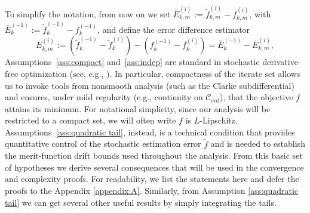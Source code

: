 \documentclass[11pt,a4paper]{article}
\newtheorem{remark}{Remark}[section]
\newcommand{\D}{\Delta}
\newcommand{\sara}[1]{{\color{red}{\textbf{[SS: #1]}}\color{black}}}
\begin{document}
\noindent
To simplify the notation, from now on we set $\bar E_{k,m}^{(i)}:=\tilde f^{(i)}_{k,m} - f^{(i)}_{k,m}$, with
\(
    \bar E_k^{(-1)}
    :=
    \tilde f_k^{(-1)}-f_k^{(-1)}
\),
 and define the error difference estimator \[E_{k,m}^{(i)}:=(\tilde f_k^{(-1)}-\tilde f_k^{(i)})-(f_k^{(-1)}-f_k^{(i)}) = \bar E_{k}^{(-1)} - \bar E_{k,m}^{(i)},\]
Assumptions~\ref{ass:compact} and~\ref{ass:indep} are standard in stochastic derivative-free optimization (see, e.g., \cite{MR4238147,MR4758401}). 
In particular, compactness of the iterate set allows us to invoke tools from nonsmooth analysis
(such as the Clarke subdifferential) and ensures, under mild regularity (e.g., continuity on ${\mathcal C}_{enl}$), that
the objective $f$ attains its minimum. %
For notational simplicity, since our analysis will be restricted to a compact set, we will often write $f$ is $L$-Lipschitz.  Assumptions~\ref{ass:quadratic tail}, instead, is a technical condition that provides
quantitative control of the stochastic estimation error $\tilde f$ and
is needed to establish the merit-function drift bounds used throughout the analysis. From this basic set of hypotheses we derive several consequences that will be used in the convergence
and complexity proofs. For readability, we list the statements here and defer the proofs to the Appendix \ref{appendix:A}.
Similarly, from Assumption \ref{ass:quadratic tail} we can get several other useful results by simply integrating the tails.
\end{document}
